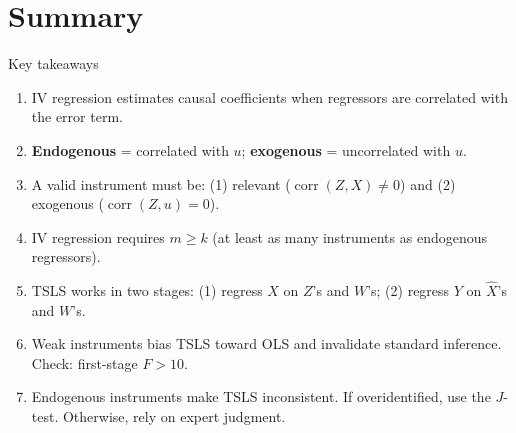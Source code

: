 \documentclass[10pt]{beamer}
\begin{document}
\section{Summary}

\begin{frame}{Key takeaways}
\label{slide:summary}
\begin{enumerate}
  \item IV regression estimates causal coefficients when regressors are correlated with the error term.

  \item \textbf{Endogenous} = correlated with $u$; \textbf{exogenous} = uncorrelated with $u$.

  \item A valid instrument must be: (1) \alert{relevant} ($\operatorname{corr}(Z,X) \neq 0$) and (2) \alert{exogenous} ($\operatorname{corr}(Z,u) = 0$).

  \item IV regression requires $m \geq k$ (at least as many instruments as endogenous regressors).

  \item TSLS works in two stages: (1) regress $X$ on $Z$'s and $W$'s; (2) regress $Y$ on $\widehat{X}$'s and $W$'s.

  \item \alert{Weak instruments} bias TSLS toward OLS and invalidate standard inference. Check: first-stage $F > 10$.

  \item \alert{Endogenous instruments} make TSLS inconsistent. If overidentified, use the $J$-test. Otherwise, rely on expert judgment.
\end{enumerate}
\end{frame}
\end{document}
